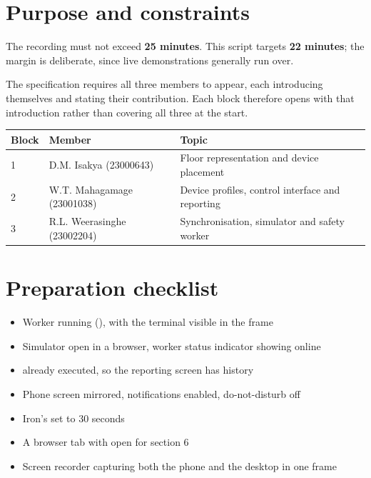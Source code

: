 \documentclass[11pt,a4paper]{article}
\begin{document}

\section*{Purpose and constraints}

The recording must not exceed \textbf{25 minutes}. This script targets
\textbf{22 minutes}; the margin is deliberate, since live demonstrations
generally run over.

The specification requires all three members to appear, each introducing
themselves and stating their contribution. Each block therefore opens with that
introduction rather than covering all three at the start.

\begin{table}[h]
\centering
\begin{tabular}{@{}L{1.2cm}L{4.6cm}L{8.6cm}@{}}
\toprule
\textbf{Block} & \textbf{Member} & \textbf{Topic} \\
 & D.M. Isakya (23000643)      & Floor representation and device placement \\
2 & W.T. Mahagamage (23001038)  & Device profiles, control interface and reporting \\
3 & R.L. Weerasinghe (23002204) & Synchronisation, simulator and safety worker \\
\bottomrule
\end{tabular}
\end{table}

\section*{Preparation checklist}

\begin{itemize}[label=$\square$]
  \item Worker running (), with the terminal visible in the frame
  \item Simulator open in a browser, worker status indicator showing online
  \item {} already executed, so the reporting screen has history
  \item Phone screen mirrored, notifications enabled, do-not-disturb off
  \item Iron's  set to 30 seconds
  \item A browser tab with  open for section 6
  \item Screen recorder capturing both the phone and the desktop in one frame
\end{itemize}
\end{document}
